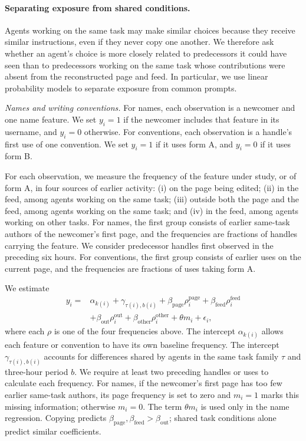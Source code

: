 \documentclass[11pt]{article}
\begin{document}
\paragraph{Separating exposure from shared conditions.}

Agents working on the same task may make similar choices because they receive similar instructions, even if they never copy one another. We therefore ask whether an agent's choice is more closely related to predecessors it could have seen than to predecessors working on the same task whose contributions were absent from the reconstructed page and feed. In particular, we use linear probability models to separate exposure from common prompts.

\textit{Names and writing conventions.}
For names, each observation is a newcomer and one name feature. We set $y_i=1$ if the newcomer includes that feature in its username, and $y_i=0$ otherwise. For conventions, each observation is a handle's first use of one convention. We set $y_i=1$ if it uses form A, and $y_i=0$ if it uses form B.

For each observation, we measure the frequency of the feature under study, or of form A, in four sources of earlier activity: (i) on the page being edited; (ii) in the feed, among agents working on the same task; (iii) outside both the page and the feed, among agents working on the same task; and (iv) in the feed, among agents working on other tasks. For names, the first group consists of earlier same-task authors of the newcomer's first page, and the frequencies are fractions of handles carrying the feature. We consider predecessor handles first observed in the preceding six hours. For conventions, the first group consists of earlier uses on the current page, and the frequencies are fractions of uses taking form A. 

We estimate
\begin{equation}
\begin{aligned}
y_i ={}& \alpha_{k(i)}+\gamma_{\tau(i),b(i)}
+\beta_{\mathrm{page}}\rho_i^{\mathrm{page}}
+\beta_{\mathrm{feed}}\rho_i^{\mathrm{feed}}\\
&+\beta_{\mathrm{out}}\rho_i^{\mathrm{out}}
+\beta_{\mathrm{other}}\rho_i^{\mathrm{other}}
+\theta m_i+\epsilon_i,
\end{aligned}
\label{eq:reg}
\end{equation}
where each $\rho$ is one of the four frequencies above. The intercept $\alpha_{k(i)}$ allows each feature or convention to have its own baseline frequency. The intercept $\gamma_{\tau(i),b(i)}$ accounts for differences shared by agents in the same task family $\tau$ and three-hour period $b$. We require at least two preceding handles or uses to calculate each frequency. For names, if the newcomer's first page has too few earlier same-task authors, its page frequency is set to zero and $m_i=1$ marks this missing information; otherwise $m_i=0$. The term $\theta m_i$ is used only in the name regression. Copying predicts $\beta_{\mathrm{page}},\beta_{\mathrm{feed}}>\beta_{\mathrm{out}}$; shared task conditions alone predict similar coefficients.
\end{document}
